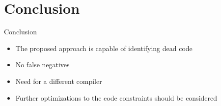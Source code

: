 \documentclass[10pt]{beamer}
\begin{document}
\section{Conclusion}

\begin{frame}{Conclusion}
	\begin{itemize}
		\item The proposed approach is capable of identifying dead code
		\pause
		\item No false negatives
		\pause
		\item Need for a different compiler
		\pause
		\item Further optimizations to the code constraints should be considered
	\end{itemize}
\end{frame}
\end{document}
